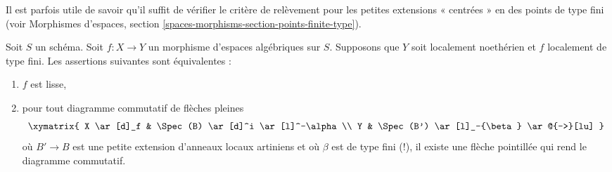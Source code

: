 \noindent
Il est parfois utile de savoir qu'il suffit de vérifier le
critère de relèvement pour les petites extensions « centrées » en des points
de type fini (voir
Morphismes d'espaces, section \ref{spaces-morphisms-section-points-finite-type}).

\begin{lemma}
\label{lemma-lifting-along-artinian}
Soit $S$ un schéma. Soit $f : X \to Y$ un morphisme d'espaces algébriques
sur $S$. Supposons que $Y$ soit localement noethérien et $f$ localement de type fini.
Les assertions suivantes sont équivalentes :
\begin{enumerate}
\item $f$ est lisse,
\item pour tout diagramme commutatif de flèches pleines
$$
\xymatrix{
X \ar[d]_f & \Spec(B) \ar[d]^i \ar[l]^-\alpha \\
Y & \Spec(B') \ar[l]_-{\beta} \ar@{-->}[lu]
}
$$
où $B' \to B$ est une petite extension d'anneaux locaux artiniens
et où $\beta$ est de type fini (!), il existe une flèche pointillée qui rend
le diagramme commutatif.
\end{enumerate}
\end{lemma}

